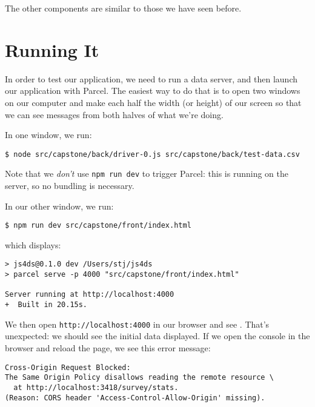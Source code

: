 \noindent
The other components are similar to those we have seen before.

\section{Running It}\label{s:capstone-run}

In order to test our application,
we need to run a data server,
and then launch our application with Parcel.
The easiest way to do that is to open two windows on our computer
and make each half the width (or height) of our screen
so that we can see messages from both halves of what we're doing.

In one window,
we run:

\begin{verbatim}
$ node src/capstone/back/driver-0.js src/capstone/back/test-data.csv
\end{verbatim}

\noindent
Note that we \emph{don't} use \texttt{npm\ run\ dev} to trigger Parcel:
this is running on the server,
so no bundling is necessary.

In our other window,
we run:

\begin{verbatim}
$ npm run dev src/capstone/front/index.html
\end{verbatim}

\noindent
which displays:

\begin{verbatim}
> js4ds@0.1.0 dev /Users/stj/js4ds
> parcel serve -p 4000 "src/capstone/front/index.html"

Server running at http://localhost:4000
+  Built in 20.15s.
\end{verbatim}


We then open \texttt{http://localhost:4000} in our browser and see .
That's unexpected: we should see the initial data displayed.
If we open the console in the browser and reload the page,
we see this error message:

\begin{verbatim}
Cross-Origin Request Blocked:
The Same Origin Policy disallows reading the remote resource \
  at http://localhost:3418/survey/stats.
(Reason: CORS header 'Access-Control-Allow-Origin' missing).
\end{verbatim}

